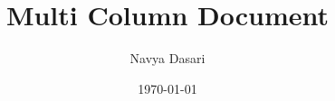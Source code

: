 \documentclass{article}
\title{Multi Column Document}
\author{Navya Dasari}
\date{\today}
\begin{document}
	\maketitle
	\setlength{\columnsep}{25pt}
	\setlength{\columnseprule}{2pt}
	
	\begin{multicols}{3}
	
	
	\end{multicols}
	
\end{document}
